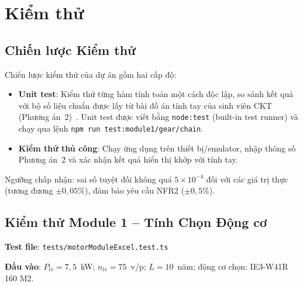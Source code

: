 \chapter{Kiểm thử}
\label{chap:testing}

\section{Chiến lược Kiểm thử}
\label{sec:test-strategy}

Chiến lược kiểm thử của dự án gồm hai cấp độ:

\begin{itemize}
  \item \textbf{Unit test}: Kiểm thử từng hàm tính toán một cách độc lập,
        so sánh kết quả với bộ số liệu chuẩn được lấy từ bài đồ án tính tay
        của sinh viên CKT (Phương án~2)~\cite{LeNhatTruong2026}.
        Unit test được viết bằng \texttt{node:test} (built-in test runner)
        và chạy qua lệnh \texttt{npm run test:module1/gear/chain}.
  \item \textbf{Kiểm thử thủ công}: Chạy ứng dụng trên thiết bị/emulator,
        nhập thông số Phương án~2 và xác nhận kết quả hiển thị khớp với tính tay.
\end{itemize}

Ngưỡng chấp nhận: sai số tuyệt đối không quá $5 \times 10^{-4}$
đối với các giá trị thực (tương đương $\pm 0{,}05\%$),
đảm bảo yêu cầu NFR2 ($\pm 0{,}5\%$).

\section{Kiểm thử Module 1 -- Tính Chọn Động cơ}
\label{sec:test-m1}

\textbf{Test file}: \texttt{tests/motorModuleExcel.test.ts}

\textbf{Đầu vào}: $P_{lv} = 7{,}5$~kW; $n_{lv} = 75$~v/p; $L = 10$~năm;
động cơ chọn: IE3-W41R 160 M2.

